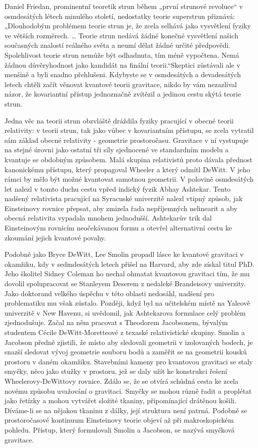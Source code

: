   Daniel Friedan, prominentní teoretik strun během „první strunové revoluce“ v osmdesátých létech
  minulého století, nedostatky teorie superstrun přiznává: „Dlouhodobým problémem teorie strun je,
  že zcela selhává jako vysvětlení fyziky ve větších rozměrech. … Teorie strun nedává žádné konečné
  vysvětlení našich současných znalostí reálného světa a neumí dělat žádné určité předpovědi.
  Spolehlivost teorie strun nemůže být odhadnuta, tím méně vypočtena. Nemá žádnou důvěryhodnost jako
  kandidát na finální teorii.“Skeptici zůstávali ale v menšině a byli snadno přehlušeni. Kdybyste se
  v osmdesátých a devadesátých letech chtěli začít věnovat kvantové teorii gravitace, nikdo by vám
  nezazlíval názor, že kovariantní přístup jednoznačně zvítězil a jedinou cestu skýtá teorie strun.
  
  Jedna věc na teorii strun obzvláště dráždila fyziky pracující v obecné teorii relativity: v teorii
  strun, tak jako vůbec v kovariantním přístupu, se zcela vytratil sám základ obecné relativity -
  geometrie prostoročasu. Gravitace v ní vystupuje na stejné úrovni jako ostatní tři síly sjednocené
  ve standardním modelu a kvantuje se obdobným způsobem. Malá skupina relativistů proto dávala
  přednost kanonickému přístupu, který propagoval Wheeler a který odmítl DeWitt. V jeho rámci by
  mělo být možné kvantovat samotnou geometrii. V polovině osmdesátých let nalezl v tomto duchu cestu
  vpřed indický fyzik Abhay Ashtekar. Tento nadšený relativista pracující na Syracuské univerzitě
  nalezl vtipný způsob, jak Einsteinovy rovnice přepsat, aby zmizela řada nepříjemných nelinearit a
  aby obecná relativita vypadala mnohem jednodušší. Ashtekarův trik dal Einsteinovým rovnicím
  neočekávanou formu a otevřel alternativní cestu ke zkoumání jejich kvantové povahy. 
  
  Podobně jako Bryce DeWitt, Lee Smolin propadl lásce ke kvantové gravitaci v okamžiku, kdy v
  sedmdesátých letech přišel na Harvard, aby zde získal titul PhD. Jeho školitel Sidney Coleman ho
  nechal ohmatat kvantovou gravitaci tím, že mu dovolil spolupracovat se Stanleyem Deserem z
  nedaleké Brandeisovy univerzity. Jako doktorand velkého úspěchu v této oblasti nedosáhl, nadšení
  pro problematiku mu však zůstalo. Později, když byl na učitelském místě na Yaleově univerzitě v
  New Havenu, si uvědomil, jak Ashtekarova formulace celý problém zjednodušuje. Začal na něm
  pracovat s Theodorem Jacobsonem, bývalým studentem Cécile DeWitt-Moretteové z texaské
  relativistické skupiny. Smolin a Jacobson předně zjistili, že místo aby sledovali geometrii v
  izolovaných bodech, je snazší sledovat vývoj geometrie souboru bodů a zaměřit se na geometrii
  kousků prostoru v daném okamžiku. Stavebními kameny pro kvantovou gravitaci se staly smyčky, něco
  jako stužky v prostoru, jež se daly užít ke konstrukci řešení Wheelerovy-DeWittovy rovnice. Zdálo
  se, že se otvírá schůdná cesta ke zcela novému způsobu uvažování o gravitaci. Smyčky se mohou
  různě řadit a proplétat jako řetízky a mohou vytvářet složité tkaniny, připomínající drátěnou
  košili. Díváme-li se na nějakou tkaninu z dálky, její struktura není patrná. Podobně se
  prostoročasové kontinuum Einsteinovy teorie objeví až při makroskopickém pohledu. Přístup, který
  formulovali Smolin a Jacobson, se nazývá smyčková gravitace. 
  
